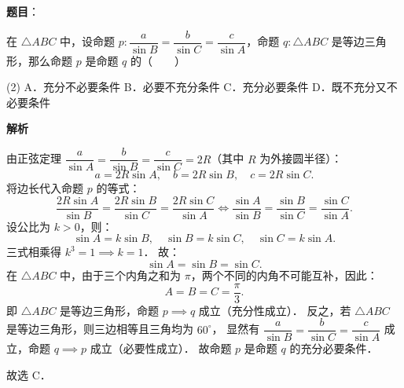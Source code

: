 \begin{answer}

\textbf{题目}：

在 $\triangle ABC$ 中，设命题 $p: \dfrac{a}{\sin B} = \dfrac{b}{\sin C} = \dfrac{c}{\sin A}$，命题 $q: \triangle ABC$ 是等边三角形，那么命题 $p$ 是命题 $q$ 的\mbox{（　　）}

\begin{gkopts}(2)
\task A．充分不必要条件
\task B．必要不充分条件
\task C．充分必要条件
\task D．既不充分又不必要条件
\end{gkopts}

\textbf{解析}

由正弦定理 $\dfrac{a}{\sin A} = \dfrac{b}{\sin B} = \dfrac{c}{\sin C} = 2R$（其中 $R$ 为外接圆半径）：
\nopagebreak[4]
\[
a = 2R\sin A, \quad b = 2R\sin B, \quad c = 2R\sin C.
\]
将边长代入命题 $p$ 的等式：
\nopagebreak[4]
\[
\dfrac{2R\sin A}{\sin B} = \dfrac{2R\sin B}{\sin C} = \dfrac{2R\sin C}{\sin A} \iff \dfrac{\sin A}{\sin B} = \dfrac{\sin B}{\sin C} = \dfrac{\sin C}{\sin A}.
\]
设公比为 $k > 0$，则：
\nopagebreak[4]
\[
\sin A = k\sin B, \quad \sin B = k\sin C, \quad \sin C = k\sin A.
\]
三式相乘得 $k^3 = 1 \implies k = 1$．
故：
\nopagebreak[4]
\[
\sin A = \sin B = \sin C.
\]
在 $\triangle ABC$ 中，由于三个内角之和为 $\pi$，两个不同的内角不可能互补，因此：
\nopagebreak[4]
\[
A = B = C = \dfrac{\pi}{3}.
\]
即 $\triangle ABC$ 是等边三角形，命题 $p \implies q$ 成立（充分性成立）．
反之，若 $\triangle ABC$ 是等边三角形，则三边相等且三角均为 $60^\circ$，
显然有 $\dfrac{a}{\sin B} = \dfrac{b}{\sin C} = \dfrac{c}{\sin A}$ 成立，命题 $q \implies p$ 成立（必要性成立）．
故命题 $p$ 是命题 $q$ 的充分必要条件．

故选 C．


\end{answer}
